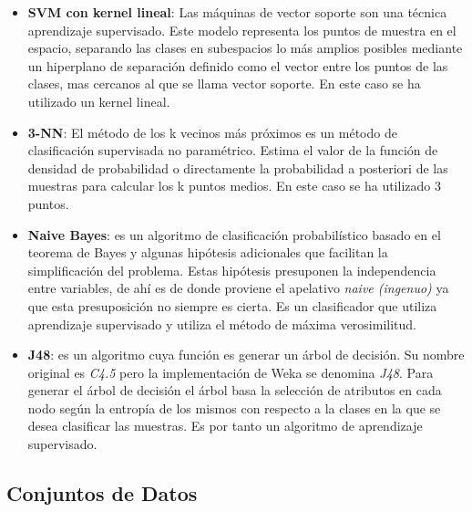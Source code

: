 \documentclass[10pt, a4paper,spanish]{article}
\begin{document}
			\begin{itemize}
				\item \textbf{SVM con kernel lineal}: Las máquinas de vector soporte son una técnica aprendizaje supervisado. Este modelo representa los puntos de muestra en el espacio, separando las clases en  subespacios lo más amplios posibles mediante un hiperplano de separación definido como el vector entre los puntos de las clases, mas cercanos al que se llama vector soporte. En este caso se ha utilizado un kernel lineal.

				\item \textbf{3-NN}: El método de los k vecinos más próximos es un método de clasificación supervisada no paramétrico. Estima el valor de la función de densidad de probabilidad o directamente la probabilidad a posteriori de las muestras para calcular los k puntos medios. En este caso se ha utilizado 3 puntos.

				\item \textbf{Naive Bayes}: es un algoritmo de clasificación probabilístico basado en el teorema de Bayes y algunas hipótesis adicionales que facilitan la simplificación del problema. Estas hipótesis presuponen la independencia entre variables, de ahí es de donde proviene el apelativo \emph{naive (ingenuo)} ya que esta presuposición no siempre es cierta. Es un clasificador que utiliza aprendizaje supervisado y utiliza el método de máxima verosimilitud.

				\item \textbf{J48}: es un algoritmo cuya función es generar un árbol de decisión. Su nombre original es \emph{C4.5} pero la implementación de Weka se denomina \emph{J48}. Para generar el árbol de decisión el árbol basa la selección de atributos en cada nodo según la entropía de los mismos con respecto a la clases en la que se desea clasificar las muestras. Es por tanto un algoritmo de aprendizaje supervisado.
			\end{itemize}

		\subsection{Conjuntos de Datos}
\end{document}
